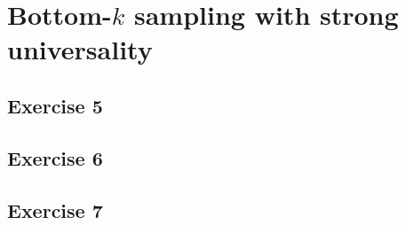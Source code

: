 \section{Bottom-$k$ sampling with strong universality}
\subsection{Exercise 5}
\subsection{Exercise 6}
\subsection{Exercise 7}